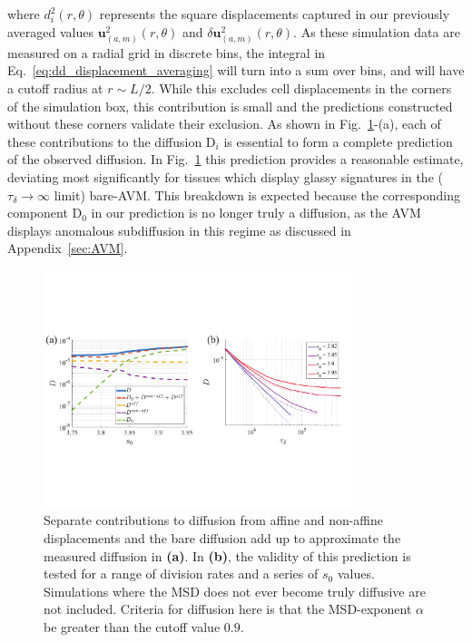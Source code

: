 \documentclass[
reprint
,aps
,amssymb
,amsmath
,superscriptaddress
]{revtex4-1}
\begin{document}
where  $d^2_i(r, \theta)$ represents the square displacements captured in our previously averaged values  $\mathbf{u}^2_{(a,m)}(r, \theta)$ and $\delta\mathbf{u}^2_{(a,m)}(r, \theta)$. As these simulation data are measured on a radial grid in discrete bins, the integral in Eq.~\ref{eq:dd_displacement_averaging} will turn into a sum over bins, and will have a cutoff radius at $r \sim L/2$. While this excludes cell displacements in the corners of the simulation box, this contribution is small and the predictions constructed without these corners validate their exclusion. As shown in Fig.~\ref{fig:dd_diffusion_check}-(a), each of these contributions to the diffusion $\mathrm{D}_i$ is essential to form a complete prediction of the observed diffusion. In Fig.~\ref{fig:dd_diffusion_check} this prediction provides a reasonable estimate, deviating most significantly for tissues which display glassy signatures in the ($\tau_\delta \rightarrow \infty$ limit) bare-AVM. This breakdown is expected because the corresponding component $\mathrm{D}_0$ in our prediction is no longer truly a diffusion, as the AVM displays anomalous subdiffusion in this regime as discussed in Appendix~\ref{sec:AVM}.

\begin{figure}[!t]  
\begin{center}
    \includegraphics[width=0.8\textwidth]{manuscript_images_dd_predicting_diffusions.pdf}
    \caption{\label{fig:dd_diffusion_check} Separate contributions to diffusion from affine and non-affine displacements and the bare diffusion add up to approximate the measured diffusion in \textbf{(a)}. In \textbf{(b)}, the validity of this prediction is tested for a range of division rates and a series of $s_0$ values. Simulations where the MSD does not ever become truly diffusive are not included. Criteria for diffusion here is that the MSD-exponent $\alpha$ be greater than the cutoff value $0.9$.}
    \end{center}
\end{figure}
\end{document}
